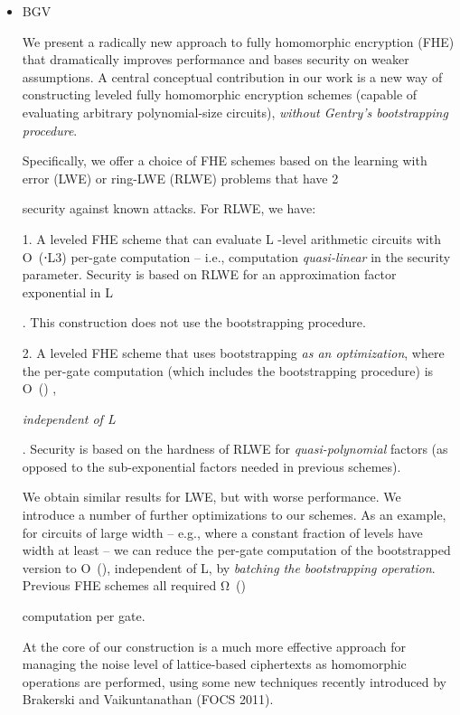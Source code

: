 \begin{itemize}

    \item BGV

    We present a radically new approach to fully homomorphic encryption (FHE) that dramatically improves performance and bases security on weaker assumptions. A central conceptual contribution in our work is a new way of constructing leveled fully homomorphic encryption schemes (capable of evaluating arbitrary polynomial-size circuits), {\em without Gentry's bootstrapping procedure}.

    Specifically, we offer a choice of FHE schemes based on the learning with error (LWE) or ring-LWE (RLWE) problems that have 2\secparam

    security against known attacks. For RLWE, we have:

    1. A leveled FHE scheme that can evaluate L
    -level arithmetic circuits with O~(\secparam⋅L3) per-gate computation -- i.e., computation {\em quasi-linear} in the security parameter. Security is based on RLWE for an approximation factor exponential in L

    . This construction does not use the bootstrapping procedure.

    2. A leveled FHE scheme that uses bootstrapping {\em as an optimization}, where the per-gate computation (which includes the bootstrapping procedure) is O~()
    , {\em independent of L

    }. Security is based on the hardness of RLWE for {\em quasi-polynomial} factors (as opposed to the sub-exponential factors needed in previous schemes).

    We obtain similar results for LWE, but with worse performance. We introduce a number of further optimizations to our schemes. As an example, for circuits of large width -- e.g., where a constant fraction of levels have width at least \secparam
    -- we can reduce the per-gate computation of the bootstrapped version to O~(\secparam), independent of L, by {\em batching the bootstrapping operation}. Previous FHE schemes all required Ω~()

    computation per gate.

    At the core of our construction is a much more effective approach for managing the noise level of lattice-based ciphertexts as homomorphic operations are performed, using some new techniques recently introduced by Brakerski and Vaikuntanathan (FOCS 2011).
    

\end{itemize}
